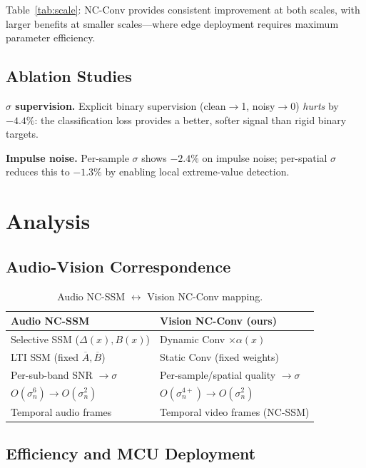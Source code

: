 \documentclass[runningheads]{llncs}
\begin{document}
Table~\ref{tab:scale}: NC-Conv provides consistent improvement at both scales, with larger benefits at smaller scales---where edge deployment requires maximum parameter efficiency.


\subsection{Ablation Studies}
\label{sec:ablation}

\noindent\textbf{$\sigma$ supervision.}
Explicit binary supervision (clean$\to$1, noisy$\to$0) \emph{hurts} by $-4.4\%$: the classification loss provides a better, softer signal than rigid binary targets.

\noindent\textbf{Impulse noise.}
Per-sample $\sigma$ shows $-2.4\%$ on impulse noise; per-spatial $\sigma$ reduces this to $-1.3\%$ by enabling local extreme-value detection.


\section{Analysis}
\label{sec:analysis}

\subsection{Audio-Vision Correspondence}

\begin{table}[t]
\centering
\caption{Audio NC-SSM $\leftrightarrow$ Vision NC-Conv mapping.}
\label{tab:mapping}
\small
\begin{tabular}{@{}ll@{}}
\toprule
\textbf{Audio NC-SSM}~\cite{choi2026ncssm} & \textbf{Vision NC-Conv (ours)} \\
\midrule
Selective SSM ($\Delta(x), B(x)$) & Dynamic Conv $\times \alpha(x)$ \\
LTI SSM (fixed $\overline{A}, \overline{B}$) & Static Conv (fixed weights) \\
Per-sub-band SNR $\to \sigma$ & Per-sample/spatial quality $\to \sigma$ \\
$O(\sigma_n^6) \to O(\sigma_n^2)$ & $O(\sigma_n^{4+}) \to O(\sigma_n^2)$ \\
Temporal audio frames & Temporal video frames (NC-SSM) \\
\bottomrule
\end{tabular}
\end{table}


\subsection{Efficiency and MCU Deployment}
\end{document}
